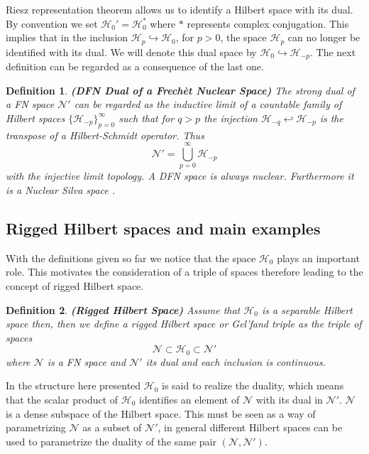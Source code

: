 \documentclass[12pt]{article}%
\newtheorem{definition}{Definition}%
\begin{document}
 Riesz representation theorem allows us to identify a Hilbert space with its dual. By convention we set $\mathcal{H}_0'=\mathcal{H}_0^*$ where $*$ represents complex conjugation. This implies that in the inclusion $\mathcal{H}_p\hookrightarrow\mathcal{H}_0$, for $p>0$, the space $\mathcal{H}_p$ can no longer be identified with its dual. We will denote this dual space by $\mathcal{H}_0\hookrightarrow\mathcal{H}_{-p}$. The next definition can be regarded as a consequence of the last one. 

\begin{definition}
    \label{def:DFN}
    {\bf (DFN Dual of a Frechèt Nuclear Space)} The strong dual of a FN space  $\mathcal{N}'$  can be regarded as the inductive limit of a countable family of Hilbert spaces $\{\mathcal{H}_{-p}\}_{p=0}^\infty$ such that for $q>p$
    the injection $\mathcal{H}_{-q}\hookleftarrow \mathcal{H}_{-p}$ is the transpose of a  Hilbert-Schmidt operator. Thus
    $$
    \mathcal{N}'=\bigcup_{p=0}^\infty\mathcal{H}_{-p} 
    $$
    with the injective limit topology. A DFN space is always nuclear. Furthermore it is a Nuclear Silva space \cite{Kriegl1997}.
\end{definition}




\subsection{Rigged Hilbert spaces and main examples}

With the definitions given so far we notice that the space $\mathcal{H}_0$ plays an important role. This motivates the consideration of a triple of spaces therefore leading to the concept of rigged Hilbert space. 

\begin{definition} {\bf (Rigged Hilbert Space)}
    \label{def:RHS}
    Assume that $\mathcal{H}_0$ is a separable Hilbert space then, then we define a rigged Hilbert space or Gel'fand triple as the triple of spaces
\begin{equation*}
\label{eq:rigged}
\mathcal{N}\subset \mathcal{H}_0 \subset \mathcal{N}'
\end{equation*}
where $\mathcal{N}$ is a FN space and $\mathcal{N}'$ its dual and each inclusion is continuous. 

\end{definition}

In the structure here presented $\mathcal{H}_0$ is said to realize the duality, which means that the scalar product of $\mathcal{H}_0$ identifies an element of $\mathcal{N}$ with its dual in $\mathcal{N}'$. 
$\mathcal{N}$ is a dense subspace of the Hilbert space.
This must be seen as a way of parametrizing  $\mathcal{N}$ as a subset of $\mathcal{N}'$, in general different Hilbert spaces can be used to parametrize the duality of the same pair $(\mathcal{N},\mathcal{N}')$.
\end{document}
